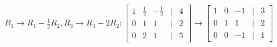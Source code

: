 \documentclass[preview]{standalone}
\begin{document}
\begin{align*}
R_1 \rightarrow R_1 - \frac{1}{2}R_2, R_3 \rightarrow R_3 - 2R_2: \begin{bmatrix} 1 & \frac{1}{2} & -\frac{1}{2} & | & 4 \\ 0 & 1 & 1 & | & 2 \\ 0 & 2 & 1 & | & 5 \end{bmatrix} \rightarrow \begin{bmatrix} 1 & 0 & -1 & | & 3 \\ 0 & 1 & 1 & | & 2 \\ 0 & 0 & -1 & | & 1 \end{bmatrix}
\end{align*}
\end{document}
